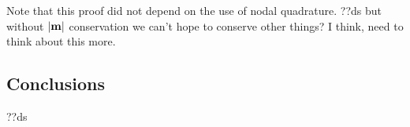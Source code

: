 
Note that this proof did not depend on the use of nodal quadrature.
??ds but without $|\mathbf{m}|$ conservation we can't hope to conserve other things? I think, need to think about this more.


\subsection{Conclusions}

??ds


 
